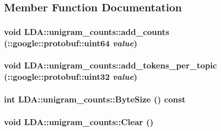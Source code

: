 \subsection{Member Function Documentation}
\hypertarget{class_l_d_a_1_1unigram__counts_a99fc603e2681c467c849fba472a70f35}{
\subsubsection[{add\_\-counts}]{\setlength{\rightskip}{0pt plus 5cm}void LDA::unigram\_\-counts::add\_\-counts (::google::protobuf::uint64 {\em value})}}
\label{class_l_d_a_1_1unigram__counts_a99fc603e2681c467c849fba472a70f35}
\hypertarget{class_l_d_a_1_1unigram__counts_a69790173932d812cdacb953d61f1ca32}{
\subsubsection[{add\_\-tokens\_\-per\_\-topic}]{\setlength{\rightskip}{0pt plus 5cm}void LDA::unigram\_\-counts::add\_\-tokens\_\-per\_\-topic (::google::protobuf::uint32 {\em value})}}
\label{class_l_d_a_1_1unigram__counts_a69790173932d812cdacb953d61f1ca32}
\hypertarget{class_l_d_a_1_1unigram__counts_a19c31ef11c051203eeb433c5bcbc0d53}{
\subsubsection[{ByteSize}]{\setlength{\rightskip}{0pt plus 5cm}int LDA::unigram\_\-counts::ByteSize () const}}
\label{class_l_d_a_1_1unigram__counts_a19c31ef11c051203eeb433c5bcbc0d53}
\hypertarget{class_l_d_a_1_1unigram__counts_a96c7cf4b1e555f9ac14667e9cd3165d4}{
\subsubsection[{Clear}]{\setlength{\rightskip}{0pt plus 5cm}void LDA::unigram\_\-counts::Clear ()}}
